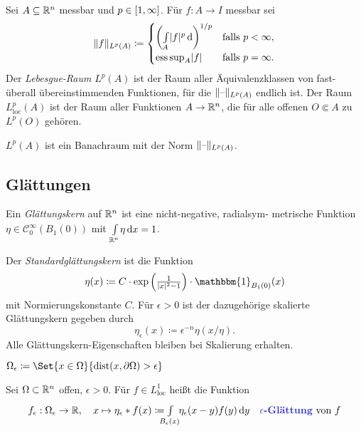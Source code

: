 \documentclass{cheat-sheet}
\newcommand{\ind}{\mathbbm{1}} %
\DeclareMathOperator{\dist}{dist} %
\DeclareMathOperator*{\esssup}{ess\,sup} %
\begin{document}
\begin{defn}
  Sei $A \subseteq \mathbb{R}^n$ messbar und $p \in \left[ 1, \infty \right]$. Für $f : A \to I$ messbar sei
  \[
    \norm{f}_{L^p(A)} \coloneqq \begin{cases}
      \left( \Int{A}{}{\abs{f}^p} \right)^{1/p} & \text{falls } p < \infty,\\
      \esssup_A \abs{f} & \text{falls } p = \infty.
    \end{cases}
  \]
  Der \emph{Lebesgue-Raum} $L^p(A)$ ist der Raum aller Äquivalenzklassen von fast-überall übereinstimmenden Funktionen, für die $\lVert\text{--}\rVert_{L^p(A)}$ endlich ist. Der Raum $L_{\text{loc}}^p(A)$ ist der Raum aller Funktionen $A \to \mathbb{R}^n$, die für alle offenen $O \Subset A$ zu $L^p(O)$ gehören.
\end{defn}

\begin{bem}
  $L^p(A)$ ist ein Banachraum mit der Norm $\lVert\text{--}\rVert_{L^p(A)}$.
\end{bem}


\subsection{Glättungen}

\begin{defn}
  Ein \emph{Glättungskern} auf $\mathbb{R}^n$ ist eine nicht-negative, radialsym- metrische Funktion $\eta \in \mathcal{C}_0^\infty(B_1(0))$ mit ${\textstyle \int\limits_{\mathbb{R}^n}^{}} \eta \,\mathrm{d} x = 1$.
\end{defn}

\begin{defn}
  Der \emph{Standardglättungskern} ist die Funktion
  \[ \eta(x) \coloneqq C \cdot \exp \left(\tfrac{1}{\abs{x}^2 - 1}\right) \cdot \ind_{B_1(0)}(x) \]
  mit Normierungskonstante $C$. Für $\epsilon > 0$ ist der dazugehörige skalierte Glättungskern gegeben durch
  \[ \eta_{\epsilon}(x) \coloneqq \epsilon^{-n} \eta(x/\eta). \]
  Alle Glättungskern-Eigenschaften bleiben bei Skalierung erhalten.
\end{defn}

\begin{nota}
  $\Omega_{\epsilon} \coloneqq \Set{ x \in \Omega }{ \dist(x, \partial \Omega) > \epsilon }$
\end{nota}

\begin{defn}
  Sei $\Omega \subset \mathbb{R}^n$ offen, $\epsilon > 0$. Für $f \in L_{\text{loc}}^1$ heißt die Funktion
  \[
    f_\epsilon : \Omega_{\epsilon} \to \R, \quad
    x \mapsto \eta_\epsilon * f(x) \coloneqq \Int{\mathclap{B_{\epsilon}(x)}}{}{\enspace\eta_{\epsilon}(x-y) f(y)}{y}
    \quad \text{\emph{$\epsilon$-Glättung} von $f$}
  \]
\end{defn}
\end{document}
